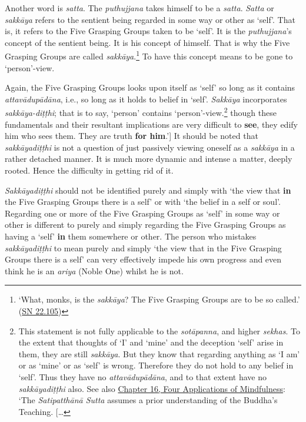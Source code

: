 Another word is \emph{satta}. The \emph{puthujjana} takes himself to be a \emph{satta}. \emph{Satta} or \emph{sakkāya} refers to the sentient being regarded in some way or other as `self'. That is, it refers to the Five Grasping Groups taken to be `self'. It is the \emph{puthujjana}'s concept of the sentient being. It is his concept of himself. That is why the Five Grasping Groups are called \emph{sakkāya}.\footnote{`What, monks, is the \emph{sakkāya}? The Five Grasping Groups are to be so called.' (\href{https://suttacentral.net/sn22.105/en/sujato}{SN 22.105})} To have this concept means to be gone to `person'-view.

Again, the Five Grasping Groups looks upon itself as `self' so long as it contains \emph{attavādupādāna}, i.e., so long as it holds to belief in `self'. \emph{Sakkāya} incorporates \emph{sakkāya-diṭṭhi}; that is to say, `person' contains `person'-view.\footnote{This statement is not fully applicable to the \emph{sotāpanna}, and higher \emph{sekhas}. To the extent that thoughts of `I' and `mine' and the deception `self' arise in them, they are still \emph{sakkāya}. But they know that regarding anything as `I am' or as `mine' or as `self' is wrong. Therefore they do not hold to any belief in `self'. Thus they have no \emph{attavādupādāna}, and to that extent have no \emph{sakkāyadiṭṭhi} also. See also \href{ch-16-satipatthana.xml\#truth-for-him}{Chapter 16, Four Applications of Mindfulness}: `The \emph{Satipatthānā Sutta} assumes a prior understanding of the Buddha's Teaching. {[}\ldots\hspace{0pt}} though these fundamentals and their resultant implications are very difficult to \textbf{see}, they edify him who sees them. They are truth \textbf{for him}.'{]} It should be noted that \emph{sakkāyadiṭṭhi} is not a question of just passively viewing oneself as a \emph{sakkāya} in a rather detached manner. It is much more dynamic and intense a matter, deeply rooted. Hence the difficulty in getting rid of it.

\emph{Sakkāyadiṭṭhi} should not be identified purely and simply with `the view that \textbf{in} the Five Grasping Groups there is a self' or with `the belief in a self or soul'. Regarding one or more of the Five Grasping Groups as `self' in some way or other is different to purely and simply regarding the Five Grasping Groups as having a `self' \textbf{in} them somewhere or other. The person who mistakes \emph{sakkāyadiṭṭhi} to mean purely and simply `the view that in the Five Grasping Groups there is a self' can very effectively impede his own progress and even think he is an \emph{ariya} (Noble One) whilst he is not.

